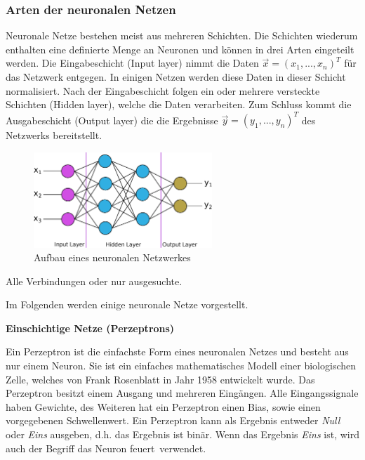 \subsubsection{Arten der neuronalen Netzen}
Neuronale Netze bestehen meist aus mehreren Schichten. Die Schichten wiederum enthalten eine definierte Menge an Neuronen und können in drei Arten eingeteilt werden. Die Eingabeschicht (Input layer) nimmt die Daten $\overrightarrow{x}=(x_{1}, ..., x_{n})^T$ für das Netzwerk entgegen. In einigen Netzen werden diese Daten in dieser Schicht normalisiert. Nach der Eingabeschicht folgen ein oder mehrere versteckte Schichten (Hidden layer), welche die Daten verarbeiten. Zum Schluss kommt die Ausgabeschicht (Output layer) die die Ergebnisse $\overrightarrow{y}=(y_{1}, ..., y_{n})^T$ des Netzwerks bereitstellt.


\begin{figure}[!ht]
	\includegraphics[width=0.6\textwidth]{content/chapter_basics/images/neuronal_network.eps}
	\centering
	\caption{Aufbau eines neuronalen Netzwerkes}
	\label{img:neural_network}
\end{figure}

Alle Verbindungen oder nur ausgesuchte.\vspace{0.2cm}

Im Folgenden werden einige neuronale Netze vorgestellt.\vspace{0.2cm}

\textbf{Einschichtige Netze (Perzeptrons)}\vspace{0.2cm}

Ein Perzeptron ist die einfachste Form eines neuronalen Netzes und besteht aus nur einem Neuron. Sie ist ein einfaches mathematisches Modell einer biologischen Zelle, welches von Frank Rosenblatt in Jahr 1958 entwickelt wurde. Das Perzeptron besitzt einem Ausgang und mehreren Eingängen. Alle Eingangssignale haben Gewichte, des Weiteren  hat ein Perzeptron einen Bias, sowie einen vorgegebenen Schwellenwert. Ein Perzeptron kann als Ergebnis entweder \textit{Null} oder \textit{Eins} ausgeben, d.h. das Ergebnis ist binär. Wenn das Ergebnis \textit{Eins} ist, wird auch der Begriff das \glqq Neuron feuert\grqq \ verwendet.\vspace{0.2cm}

